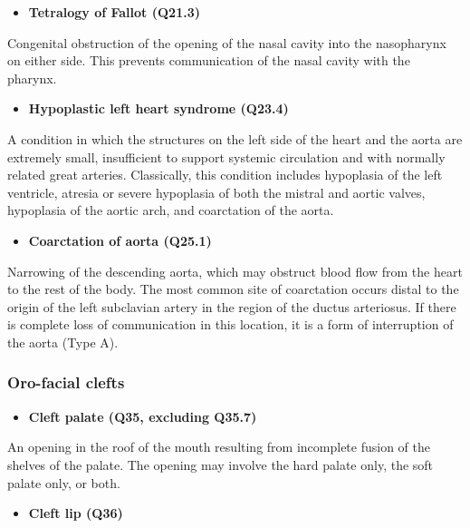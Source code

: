 \documentclass[
]{krantz}
\providecommand{\tightlist}{%
  \setlength{\itemsep}{0pt}\setlength{\parskip}{0pt}}
\begin{document}
\begin{itemize}
\tightlist
\item
  \textbf{Tetralogy of Fallot (Q21.3)}
\end{itemize}

Congenital obstruction of the opening of the nasal cavity into the nasopharynx on either side. This prevents communication of the nasal cavity with the pharynx.

\begin{itemize}
\tightlist
\item
  \textbf{Hypoplastic left heart syndrome (Q23.4)}
\end{itemize}

A condition in which the structures on the left side of the heart and the aorta are extremely small, insufficient to support systemic circulation and with normally related great arteries. Classically, this condition includes hypoplasia of the left ventricle, atresia or severe hypoplasia of both the mistral and aortic valves, hypoplasia of the aortic arch, and coarctation of the aorta.

\begin{itemize}
\tightlist
\item
  \textbf{Coarctation of aorta (Q25.1)}
\end{itemize}

Narrowing of the descending aorta, which may obstruct blood flow from the heart to the rest of the body. The most common site of coarctation occurs distal to the origin of the left subclavian artery in the region of the ductus arteriosus. If there is complete loss of communication in this location, it is a form of interruption of the aorta (Type A).

\hypertarget{section2115}{%
\subsubsection{Oro-facial clefts}\label{section2115}}

\begin{itemize}
\tightlist
\item
  \textbf{Cleft palate (Q35, excluding Q35.7)}
\end{itemize}

An opening in the roof of the mouth resulting from incomplete fusion of the shelves of the palate. The opening may involve the hard palate only, the soft palate only, or both.

\begin{itemize}
\tightlist
\item
  \textbf{Cleft lip (Q36)}
\end{itemize}
\end{document}
